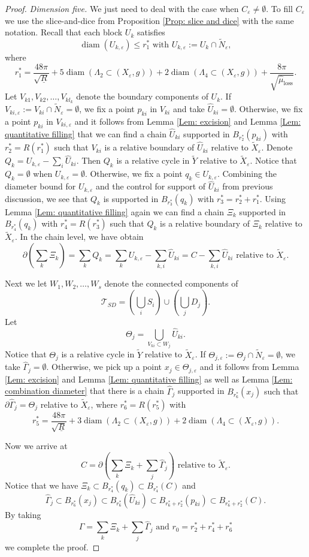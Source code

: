 \documentclass[11pt,letterpaper]{amsart}
\numberwithin{equation}{section}
\theoremstyle{definition}
\DeclareMathOperator{\diam}{diam}
\newcommand{\ve}{\varepsilon}
\newcommand{\ti}[1]{\tilde{#1}}
\begin{document}
\begin{proof}
{\it Dimension five.} We just need to deal with the case when $C_\ve\neq \emptyset$. To fill $C_\ve$ we use the slice-and-dice from Proposition \ref{Prop: slice and dice} with the same notation. Recall that each block $U_k$ satisfies
$$
\diam(U_{k,\ve})\leq r_1^* \mbox{ with } U_{k,\ve}:=U_k\cap \tilde N_\ve,
$$
where
$$
r_1^*= \frac{48\pi}{\sqrt{\underline R}}+5\diam(\Lambda_2\subset(X_\ve,g)) +2\diam(\Lambda_4\subset(X_\ve,g))+\frac{8\pi}{\sqrt{\hat \mu_{\mathrm{loss}}}}.
$$
Let $V_{k1}, V_{k2},\ldots,V_{kl_k}$ denote the boundary components of $U_k$. If $V_{ki,\ve}:=V_{ki}\cap\tilde N_\ve=\emptyset$, we fix a point $p_{ki}$ in $V_{ki}$ and take $\hat U_{ki}=\emptyset$. Otherwise, we fix a point $p_{ki}$ in $V_{ki,\ve}$ and it follows from Lemma \ref{Lem: excision} and Lemma \ref{Lem: quantitative filling} that we can find a chain $\hat U_{ki}$ supported in $B_{r_2^*}(p_{ki})$ with $r_2^*=R(r_1^*)$ such that $V_{ki}$ is a relative boundary of $\hat U_{ki}$ relative to $\tilde X_\ve$. Denote $Q_k=U_{k,\ve}-\sum_i \hat U_{ki}$. Then $Q_k$ is a relative cycle in $\tilde Y$ relative to $\tilde X_\ve$. Notice that $Q_k=\emptyset$ when $U_{k,\ve}=\emptyset$. Otherwise, we fix a point $q_k\in U_{k,\ve}$. Combining the diameter bound for $U_{k,\ve}$ and the control for support of $\hat U_{ki}$ from previous discussion, we see that $Q_k$ is supported in $B_{r_3^*}(q_k)$ with
$
r_3^*=r_2^*+r_1^*.
$
Using Lemma \ref{Lem: quantitative filling} again we can find a chain ${\Xi_k}$ supported in $B_{r_4^*}(q_k)$ with $r_4^*=R(r_3^*)$ such that $Q_k$ is a relative boundary of ${\Xi_k}$ relative to $\tilde X_\ve$. In the chain level, we have obtain
$$
\partial\left(\sum_k{\Xi_k}\right)
= \sum_{k}Q_{k}
= \sum_{k}U_{k,\ve}-\sum_{k,i}\hat U_{ki}
= C-\sum_{k,i}\hat U_{ki}\mbox{ relative to }\tilde X_\ve.
$$

Next we let $W_1,W_2,\ldots, W_s$ denote the connected components of
$$
\mathcal T_{SD}=\left(\bigcup_i S_i\right)\cup\left(\bigcup_j D_j\right).
$$
Let
$$
 \Theta_j=\bigcup_{V_{ki}\subset W_j}\hat U_{ki}.
$$
Notice that $\Theta_j$ is a relative cycle in $\tilde Y$ relative to $\tilde X_\ve$. If $\Theta_{j,\ve}:=\Theta_{j}\cap\tilde N_\ve=\emptyset$, we take $\hat \Gamma_j=\emptyset$. Otherwise, we pick up a point $x_j\in \Theta_{j,\ve}$ and it follows from Lemma \ref{Lem: excision} and Lemma \ref{Lem: quantitative filling} as well as Lemma \ref{Lem: combination diameter} that there is a chain $\hat \Gamma_j$ supported in $B_{r_6^*}(x_j)$ {such that $\partial\hat{\Gamma}_{j}=\Theta_{j}$ relative to $\ti{X}_{\ve}$}, where $r_6^*=R(r_5^*)$ with
$$r_5^*=\frac{48\pi}{\sqrt{\underline R}}+3\diam(\Lambda_2\subset(X_\ve,g))+2\diam(\Lambda_4\subset(X_\ve,g)).$$

Now we arrive at
$$
C=\partial\left(\sum_k{\Xi_k}+\sum_j\hat\Gamma_j\right)\mbox{ relative to }\tilde X_\ve.
$$
Notice that we have ${\Xi_k}\subset B_{r_4^*}(q_k)\subset B_{r_4^*}(C)$ and
$$\hat\Gamma_j\subset B_{r_6^*}(x_j)\subset B_{r_6^*}(\hat U_{ki})\subset B_{r_6^*+r_2^*}(p_{ki})\subset B_{r_6^*+r_2^*}(C).$$
By taking
$$\Gamma=\sum_k{\Xi_k}+\sum_j\hat\Gamma_j\mbox{ and }r_0=r_2^*+r_4^*+r_6^*$$
we complete the proof.
\end{proof}
\end{document}
